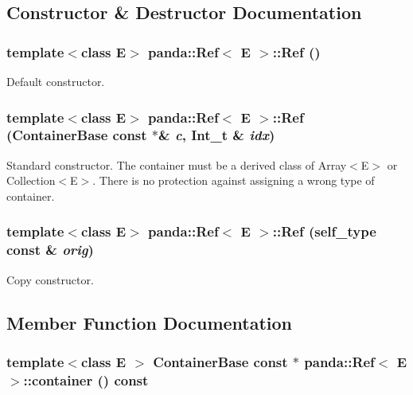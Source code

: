 \subsection{Constructor \& Destructor Documentation}
\hypertarget{classpanda_1_1Ref_aa9280ff78ab44076b90831fa6d5ee05a}{
\subsubsection[{Ref}]{\setlength{\rightskip}{0pt plus 5cm}template$<$class E$>$ {\bf panda::Ref}$<$ E $>$::{\bf Ref} ()}}
\label{classpanda_1_1Ref_aa9280ff78ab44076b90831fa6d5ee05a}


Default constructor. \hypertarget{classpanda_1_1Ref_ac19a2c6f6de8291120811a2438e1f05b}{
\subsubsection[{Ref}]{\setlength{\rightskip}{0pt plus 5cm}template$<$class E$>$ {\bf panda::Ref}$<$ E $>$::{\bf Ref} ({\bf ContainerBase} const $\ast$\& {\em c}, \/  Int\_\-t \& {\em idx})}}
\label{classpanda_1_1Ref_ac19a2c6f6de8291120811a2438e1f05b}


Standard constructor. The container must be a derived class of Array$<$E$>$ or Collection$<$E$>$. There is no protection against assigning a wrong type of container. \hypertarget{classpanda_1_1Ref_ac7c585423cd52662fbd774186661024e}{
\subsubsection[{Ref}]{\setlength{\rightskip}{0pt plus 5cm}template$<$class E$>$ {\bf panda::Ref}$<$ E $>$::{\bf Ref} ({\bf self\_\-type} const \& {\em orig})}}
\label{classpanda_1_1Ref_ac7c585423cd52662fbd774186661024e}


Copy constructor. 

\subsection{Member Function Documentation}
\hypertarget{classpanda_1_1Ref_a1249f0bb38474905f0da01ead67b2c5f}{
\subsubsection[{container}]{\setlength{\rightskip}{0pt plus 5cm}template$<$class E $>$ {\bf ContainerBase} const $\ast$ {\bf panda::Ref}$<$ E $>$::container () const}}
\label{classpanda_1_1Ref_a1249f0bb38474905f0da01ead67b2c5f}


